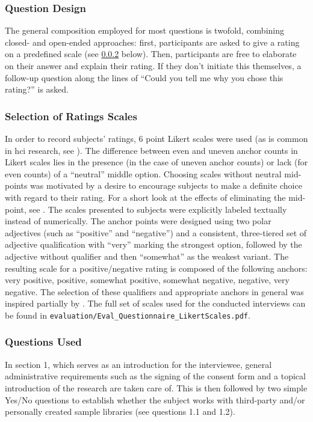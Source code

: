 \subsubsection{Question Design}
\label{subsubsec:question_design}
The general composition employed for most questions is twofold, combining
closed- and open-ended approaches: first, participants are asked to give a
rating on a predefined scale (see \ref{subsubsec:ratings_scales} below). Then,
participants are free to elaborate on their answer and explain their rating. If
they don't initiate this themselves, a follow-up question along the lines of
``Could you tell me why you chose this rating?'' is asked.

\subsubsection{Selection of Ratings Scales}
\label{subsubsec:ratings_scales}
In order to record subjects' ratings, 6 point Likert scales were used (as is
common in \gls{hci} research, see \citet[p.31, p.93]{lazar2017}). The difference
between even and uneven anchor counts in Likert scales lies in the presence (in
the case of uneven anchor counts) or lack (for even counts) of a ``neutral''
middle option. Choosing scales without neutral mid-points was motivated by a
desire to encourage subjects to make a definite choice with regard to their
rating. For a short look at the effects of eliminating the mid-point, see
\citet{garland1991}.
\smallskip
The scales presented to subjects were explicitly labeled textually instead of
numerically. The anchor points were designed using two polar adjectives (such as
``positive'' and ``negative'') and a consistent, three-tiered set of adjective
qualification with ``very'' marking the strongest option, followed by the
adjective without qualifier and then ``somewhat'' as the weakest variant. The
resulting scale for a positive/negative rating is composed of the following
anchors: very positive, positive, somewhat positive, somewhat negative,
negative, very negative. The selection of these qualifiers and appropriate
anchors in general was inspired partially by \citet{vagias2006}. The full set of
scales used for the conducted interviews can be found in
\texttt{evaluation/Eval\_Questionnaire\_LikertScales.pdf}.

\subsubsection{Questions Used}
\label{subsubsec:questions_used}
In section 1, which serves as an introduction for the interviewee, general
administrative requirements such as the signing of the consent form and a
topical introduction of the research are taken care of. This is then followed
by two simple Yes/No questions to establish whether the subject works with
third-party and/or personally created sample libraries (see questions 1.1 and
1.2).

